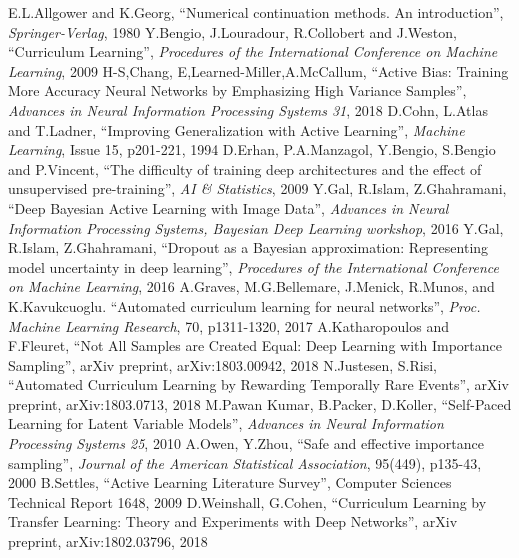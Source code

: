 \documentclass[a4paper,11pt]{article}
\begin{document}
\begin{thebibliography}{1}
E.L.Allgower and K.Georg, ``Numerical continuation methods. An introduction'', \textit{Springer-Verlag}, 1980
Y.Bengio, J.Louradour, R.Collobert and J.Weston, ``Curriculum Learning'', \textit{Procedures of the International Conference on Machine Learning}, 2009
H-S,Chang, E,Learned-Miller,A.McCallum, ``Active Bias: Training More Accuracy Neural Networks by Emphasizing High Variance Samples'', \textit{Advances in Neural Information Processing Systems 31}, 2018
D.Cohn, L.Atlas and T.Ladner, ``Improving Generalization with Active Learning'', \textit{Machine Learning}, Issue 15, p201-221, 1994
D.Erhan, P.A.Manzagol, Y.Bengio, S.Bengio and P.Vincent, ``The difficulty of training deep architectures and the effect of unsupervised pre-training'', \textit{AI \& Statistics}, 2009
Y.Gal, R.Islam, Z.Ghahramani, ``Deep Bayesian Active Learning with Image Data'', \textit{Advances in Neural Information Processing Systems, Bayesian Deep Learning workshop}, 2016
Y.Gal, R.Islam, Z.Ghahramani, ``Dropout as a Bayesian approximation: Representing model uncertainty in deep learning'', \textit{Procedures of the International Conference on Machine Learning}, 2016
A.Graves, M.G.Bellemare, J.Menick, R.Munos, and K.Kavukcuoglu. ``Automated curriculum learning for neural networks'', \textit{Proc. Machine Learning Research}, 70, p1311-1320, 2017
A.Katharopoulos and F.Fleuret, ``Not All Samples are Created Equal: Deep Learning with Importance Sampling'', arXiv preprint, arXiv:1803.00942, 2018
N.Justesen, S.Risi, ``Automated Curriculum Learning by Rewarding Temporally Rare Events'', arXiv preprint, arXiv:1803.0713, 2018
M.Pawan Kumar, B.Packer, D.Koller, ``Self-Paced Learning for Latent Variable Models'', \textit{Advances in Neural Information Processing Systems 25}, 2010
A.Owen, Y.Zhou, ``Safe and effective importance sampling'', \textit{Journal of the American Statistical Association}, 95(449), p135-43, 2000
B.Settles, ``Active Learning Literature Survey'', Computer Sciences Technical Report 1648, 2009
D.Weinshall, G.Cohen, ``Curriculum Learning by Transfer Learning: Theory and Experiments with Deep Networks'', arXiv preprint, arXiv:1802.03796, 2018
\end{thebibliography}
\end{document}
